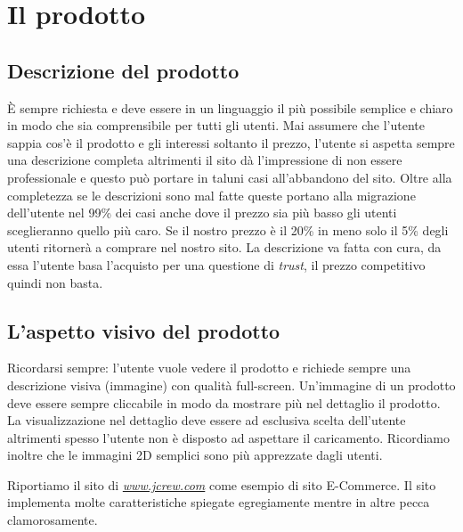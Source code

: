 	\section{Il prodotto}
	
		\subsection{Descrizione del prodotto}
			È sempre richiesta e deve essere in un linguaggio il più possibile semplice e chiaro in modo che sia comprensibile per tutti gli utenti. Mai assumere che l'utente sappia cos'è il prodotto e gli interessi soltanto il prezzo, l'utente si aspetta sempre una descrizione completa altrimenti il sito dà l'impressione di non essere professionale e questo può portare in taluni casi all'abbandono del sito.
			Oltre alla completezza se le descrizioni sono mal fatte queste portano alla migrazione dell'utente nel 99\% dei casi anche dove il prezzo sia più basso gli utenti sceglieranno quello più caro. Se il nostro prezzo è il 20\% in meno solo il 5\% degli utenti ritornerà a comprare nel nostro sito. La descrizione va fatta con cura, da essa l'utente basa l'acquisto per una questione di \emph{trust}, il prezzo competitivo quindi non basta.
		
		\subsection{L'aspetto visivo del prodotto}
			Ricordarsi sempre: l'utente vuole vedere il prodotto e richiede sempre una descrizione visiva (immagine) con qualità full-screen. Un'immagine di un prodotto deve essere sempre cliccabile in modo da mostrare più nel dettaglio il prodotto. La visualizzazione nel dettaglio deve essere ad esclusiva scelta dell'utente altrimenti spesso l'utente non è disposto ad aspettare il caricamento. Ricordiamo inoltre che le immagini 2D semplici sono più apprezzate dagli utenti.
		
			Riportiamo il sito di \href{https://www.jcrew.com/it/womens_category/sunglasses.jsp?intcmp=h1_sunglasses}{\emph{www.jcrew.com}} come esempio di sito E-Commerce. Il sito implementa molte caratteristiche spiegate egregiamente mentre in altre pecca clamorosamente.